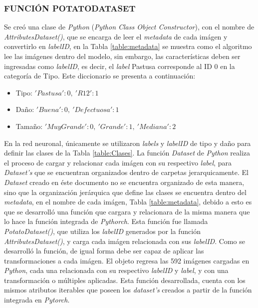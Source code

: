 \subsubsection{FUNCIÓN POTATODATASET}

Se creó una clase de \textit{Python} (\textit{Python Class Object Constructor}), con el nombre de \textit{AttributesDataset()}, que se encarga de leer el \textit{metadata}  de cada imágen y convertirlo en \textit{labelID}, en la Tabla \ref{table:metadata} se muestra como el algoritmo lee las imágenes dentro del modelo, sin embargo, las características deben ser ingresadas como \textit{labelID}, es decir, el \textit{label} Pastusa corresponde al ID $0$ en la categoría de Tipo. Este diccionario se presenta a continuación:			

\begin{itemize}
	\item Tipo: ${'Pastusa': 0, \ 'R12': 1}$
	\item Daño: ${'Buena': 0,\  'Defectuosa': 1}$
	\item Tamaño: ${'Muy Grande': 0,\ 'Grande': 1,\ 'Mediana': 2}$
\end{itemize}

En la red neuronal, únicamente se utilizaron \textit{labels} y \textit{labelID} de tipo y daño para definir las clases de la Tabla \ref{table:Clases}. La función \textit{Dataset} de \textit{Python} realiza el proceso de cargar y relacionar cada imágen con su respectivo \textit{label}, para \textit{Dataset's} que se encuentran organizados dentro de carpetas jerarquicamente. El \textit{Dataset} creado en éste documento no se encuentra organizado de esta manera, sino que la organización jerárquica que define las clases se encuentra dentro del \textit{metadata}, en el nombre de cada imágen, Tabla \ref{table:metadata}, debido a esto es que se desarrolló una función que cargara y relacionara de la misma manera que lo hace la función integrada de \textit{Pythorch}. Esta función fue llamada \textit{PotatoDataset()}, que utiliza los \textit{labelID} generados por la función \textit{AttributesDataset()}, y carga cada imágen relacionada con sus \textit{labelID}. Como se desarrolló la función, de igual forma debe ser capaz de aplicar las transformaciones a cada imágen. El objeto regresa las 592 imágenes cargadas en \textit{Python}, cada una relacionada con su respectivo \textit{labelID} y \textit{label}, y con una transformación o múltiples aplicadas. Esta función desarrollada, cuenta con los mismos atributos iterables que poseen los \textit{dataset's} creados a partir de la función integrada en \textit{Pytorch}.			


